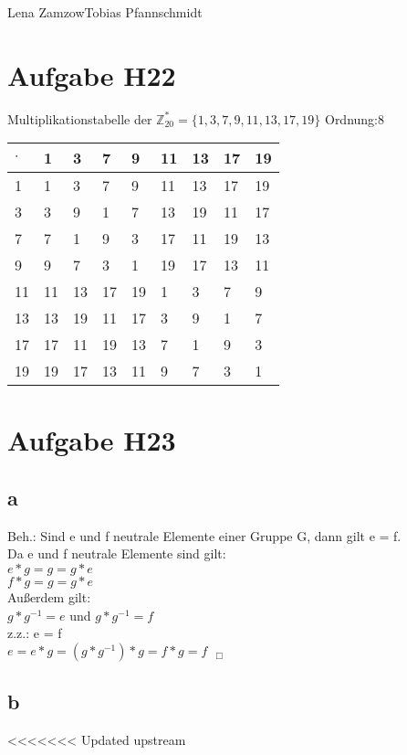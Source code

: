 \documentclass[11pt,a4paper]{article}
\begin{document}
                {Lena Zamzow}{Tobias Pfannschmidt}{}{}{}


\section*{Aufgabe H22}
Multiplikationstabelle der $\mathbb{Z}^{*}_{20} = \{1,3,7,9,11,13,17,19\}$ Ordnung:8\\
\begin{center}
	\begin{tabular}{ | l | l | l | l | l | l | l| l|l|}
		\hline
		$\cdot$&1&3&7&9&11&13&17&19 \\ \hline \hline		
		1&1&3&7&9&11&13&17&19 \\ \hline 	
		3&3&9&1&7&13&19&11&17 \\ \hline
		7&7&1&9&3&17&11&19&13\\ \hline	
		9&9&7&3&1&19&17&13&11 \\ \hline
		11&11&13&17&19&1&3&7&9 \\ \hline
		13&13&19&11&17&3&9&1&7 \\ \hline
		17&17&11&19&13&7&1&9&3 \\ \hline
		19&19&17&13&11&9&7&3&1 \\ \hline 
	\end{tabular}
\end{center}
\section*{Aufgabe H23}
\subsection*{a}
Beh.: Sind e und f neutrale Elemente einer Gruppe G, dann gilt e = f. \\

Da e und f neutrale Elemente sind gilt: \\
$e \ast g = g = g \ast e$ \\
$f \ast g = g = g \ast e$ \\
Außerdem gilt: \\
$g \ast g^{-1} = e$ und $g \ast g^{-1} = f$ \\

z.z.: e = f \\
$ e = e \ast g = (g \ast g^{-1}) \ast  g = f \ast  g = f ~~~_\Box$

\subsection*{b}
<<<<<<< Updated upstream
\end{document}

